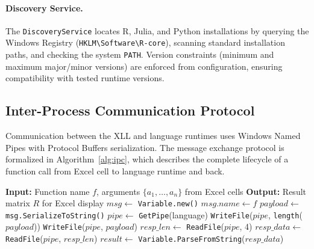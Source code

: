 \documentclass[preprint,12pt,authoryear]{elsarticle}
\providecommand{\KwInput}[1]{\textbf{Input:} #1}
\providecommand{\KwOutput}[1]{\textbf{Output:} #1}
\begin{document}
\paragraph{Discovery Service.}
The \texttt{DiscoveryService} locates R, Julia, and Python installations by querying the Windows Registry (\texttt{HKLM\textbackslash Software\textbackslash R-core}), scanning standard installation paths, and checking the system \texttt{PATH}. Version constraints (minimum and maximum major/minor versions) are enforced from configuration, ensuring compatibility with tested runtime versions.

\subsection{Inter-Process Communication Protocol}
\label{subsec:ipc}

Communication between the XLL and language runtimes uses Windows Named Pipes with Protocol Buffers serialization. The message exchange protocol is formalized in Algorithm~\ref{alg:ipc}, which describes the complete lifecycle of a function call from Excel cell to language runtime and back.

\begin{algorithm}[htbp]
\SetAlgoLined
\KwInput{Function name $f$, arguments $\{a_1, \ldots, a_n\}$ from Excel cells}
\KwOutput{Result matrix $R$ for Excel display}
\BlankLine
{}
$msg \leftarrow$ \texttt{Variable.new()}\;
$msg.name \leftarrow f$\;
$payload \leftarrow$ \texttt{msg.SerializeToString()}\;
\BlankLine
{}
$pipe \leftarrow$ \texttt{GetPipe}(language)\;
\texttt{WriteFile}($pipe$, \texttt{length}($payload$))
\texttt{WriteFile}($pipe$, $payload$)\;
\BlankLine
{}
$resp\_len \leftarrow$ \texttt{ReadFile}($pipe$, 4)\;
$resp\_data \leftarrow$ \texttt{ReadFile}($pipe$, $resp\_len$)\;
$result \leftarrow$ \texttt{Variable.ParseFromString}($resp\_data$)\;
\BlankLine
{}
\caption{IPC Protocol for Function Dispatch}
\label{alg:ipc}
\end{algorithm}
\end{document}

